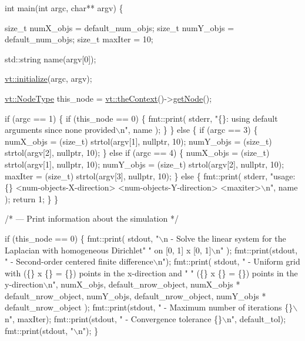 \begin{DoxyCodeInclude}
\textcolor{keywordtype}{int} main(\textcolor{keywordtype}{int} argc, \textcolor{keywordtype}{char}** argv) \{

  \textcolor{keywordtype}{size\_t} numX\_objs = default\_num\_objs;
  \textcolor{keywordtype}{size\_t} numY\_objs = default\_num\_objs;
  \textcolor{keywordtype}{size\_t} maxIter = 10;

  std::string name(argv[0]);

  \hyperlink{namespacevt_aaa266774ea8339c58be0202b00fafa62}{vt::initialize}(argc, argv);

  \hyperlink{namespacevt_a866da9d0efc19c0a1ce79e9e492f47e2}{vt::NodeType} this\_node = \hyperlink{namespacevt_a26551fe0e6e6a1371111df5b12c7e92c}{vt::theContext}()->\hyperlink{structvt_1_1ctx_1_1_context_a0d52c263ce8516546a67443d9a86fa5f}{getNode}();

  \textcolor{keywordflow}{if} (argc == 1) \{
    \textcolor{keywordflow}{if} (this\_node == 0) \{
      fmt::print(
        stderr, \textcolor{stringliteral}{"\{\}: using default arguments since none provided\(\backslash\)n"}, name
      );
    \}
  \} \textcolor{keywordflow}{else} \{
    \textcolor{keywordflow}{if} (argc == 3) \{
      numX\_objs = (size\_t) strtol(argv[1], \textcolor{keyword}{nullptr}, 10);
      numY\_objs = (size\_t) strtol(argv[2], \textcolor{keyword}{nullptr}, 10);
    \}
    \textcolor{keywordflow}{else} \textcolor{keywordflow}{if} (argc == 4) \{
      numX\_objs = (size\_t) strtol(argv[1], \textcolor{keyword}{nullptr}, 10);
      numY\_objs = (size\_t) strtol(argv[2], \textcolor{keyword}{nullptr}, 10);
      maxIter = (size\_t) strtol(argv[3], \textcolor{keyword}{nullptr}, 10);
    \}
    \textcolor{keywordflow}{else} \{
      fmt::print(
        stderr, \textcolor{stringliteral}{"usage: \{\} <num-objects-X-direction> <num-objects-Y-direction> <maxiter>\(\backslash\)n"},
        name
      );
      \textcolor{keywordflow}{return} 1;
    \}
  \}

  \textcolor{comment}{/* --- Print information about the simulation */}

  \textcolor{keywordflow}{if} (this\_node == 0) \{
    fmt::print(
      stdout, \textcolor{stringliteral}{"\(\backslash\)n - Solve the linear system for the Laplacian with homogeneous Dirichlet"}
      \textcolor{stringliteral}{" on [0, 1] x [0, 1]\(\backslash\)n"}
    );
    fmt::print(stdout, \textcolor{stringliteral}{" - Second-order centered finite difference\(\backslash\)n"});
    fmt::print(
      stdout, \textcolor{stringliteral}{" - Uniform grid with (\{\} x \{\} = \{\}) points in the x-direction and "}
      \textcolor{stringliteral}{" (\{\} x \{\} = \{\}) points in the y-direction\(\backslash\)n"},
      numX\_objs, default\_nrow\_object, numX\_objs * default\_nrow\_object,
      numY\_objs, default\_nrow\_object, numY\_objs * default\_nrow\_object
    );
    fmt::print(stdout, \textcolor{stringliteral}{" - Maximum number of iterations \{\}\(\backslash\)n"}, maxIter);
    fmt::print(stdout, \textcolor{stringliteral}{" - Convergence tolerance \{\}\(\backslash\)n"}, default\_tol);
    fmt::print(stdout, \textcolor{stringliteral}{"\(\backslash\)n"});
  \}


\end{DoxyCodeInclude}
